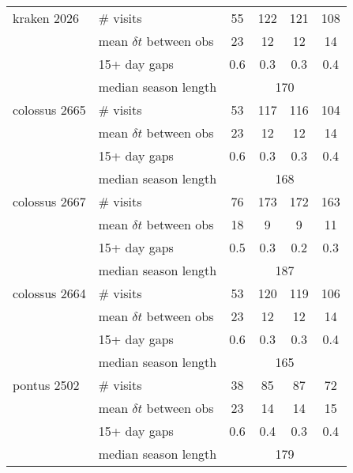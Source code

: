\begin{appendices}
\begin{longtable}{l|l|cccc}
  kraken 2026    & \# visits                   &  55  & 122  & 121  & 108  \\
                 & mean $\delta t$ between obs &  23  &  12  &  12  &  14  \\
                 & 15+ day gaps                & 0.6  & 0.3  & 0.3  & 0.4  \\
                 & median season length               & \multicolumn{4}{c}{170}   \\
  \hline

  colossus 2665  & \# visits                   &  53  & 117  & 116  & 104  \\
                 & mean $\delta t$ between obs &  23  &  12  &  12  &  14  \\
                 & 15+ day gaps                & 0.6  & 0.3  & 0.3  & 0.4  \\
                 & median season length               & \multicolumn{4}{c}{168}   \\
  \hline

  colossus 2667  & \# visits                   &  76  & 173  &  172 &  163 \\
                 & mean $\delta t$ between obs &  18  &   9  &    9 &   11 \\
                 & 15+ day gaps                &  0.5 & 0.3  & 0.2  &  0.3 \\
                 & median season length               & \multicolumn{4}{c}{187}   \\
  \hline

  colossus 2664  & \# visits                   &  53  & 120  & 119  & 106  \\
                 & mean $\delta t$ between obs &  23  &  12  &  12  &  14  \\
                 & 15+ day gaps                & 0.6  & 0.3  & 0.3  & 0.4  \\
                 & median season length               & \multicolumn{4}{c}{165}   \\
  \hline
  
  pontus 2502    & \# visits                   &  38  &  85  &  87  &  72  \\
                 & mean $\delta t$ between obs &  23  &  14  &  14  &  15  \\
                 & 15+ day gaps                & 0.6  & 0.4  & 0.3  & 0.4  \\
                 & median season length               & \multicolumn{4}{c}{179}   \\
  \hline


\end{longtable}
\end{appendices}
